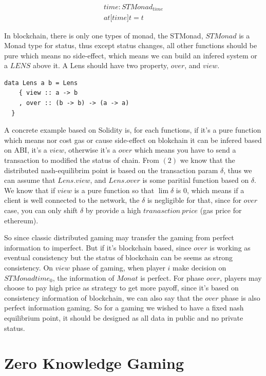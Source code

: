 \documentclass[twocolumn]{article}
\begin{document}
\begin{gather}
  time: STMonad_{time}\\
  at \mathbb{[} time \mathbb{]}t = t
\end{gather}

In blockchain, there is only one types of monad, the STMonad, $STMonad$ is a Monad type for status, thus except status changes, all other functions should be pure which means no side-effect, which means we can build an infered system or a $LENS$\cite {lens} above it. A Lens should have two property, $over$, and $view$. 

\lstset{language=Haskell}
\begin{lstlisting}
data Lens a b = Lens
    { view :: a -> b
    , over :: (b -> b) -> (a -> a)
  }
\end{lstlisting}

A concrete example based on Solidity is, for each functions, if it's a pure function which means nor cost gas or cause side-effect on blokchain it can be infered based on ABI, it's a $view$, otherwise it's a $over$ which means you have to send a transaction to modified the status of chain. From $(2)$ we know that the distributed nash-equilibrim point is based on the transaction param $\delta$, thus we can assume that $Lens.view$, and $Lens.over$ is some paritial function based on $\delta$. We know that if $view$ is a pure function so that $\lim \delta$ is 0, which means if a client is well connected to the network, the $\delta$ is negligible for that, since for $over$ case, you can only shift $\delta$ by provide a high $tranasction\ price$ (gas price for ethereum).


So since classic distributed gaming may transfer the gaming from perfect information to imperfect. But if it's blockchain based, since $over$ is working as eventual consistency\cite{consis} but the status of blockchain can be seems as strong consistency\cite {Consistent}. On $view$ phase of gaming, when player $i$ make decision on $STMonad time_0$, the information of $Monat$ is perfect. For phase $over$, players may choose to pay high price as strategy to get more payoff, since it's based on consistency information of blockchain, we can also say that the $over$ phase is also perfect information gaming. So for a gaming we wished to have a fixed nash equilibrium point, it should be designed as all data in public and no private status.

\section {Zero Knowledge Gaming}
\end{document}
